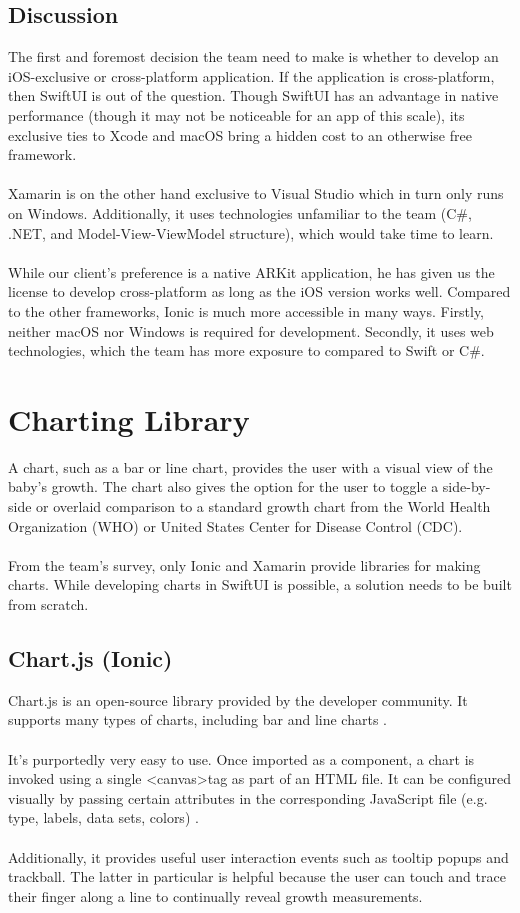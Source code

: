 \documentclass[onecolumn, draftclsnofoot,10pt, compsoc]{IEEEtran}
\begin{document}
\subsection{Discussion}
The first and foremost decision the team need to make is whether to develop an iOS-exclusive or cross-platform application. If the application is cross-platform, then SwiftUI is out of the question. Though SwiftUI has an advantage in native performance (though it may not be noticeable for an app of this scale), its exclusive ties to Xcode and macOS bring a hidden cost to an otherwise free framework.
\\\\
Xamarin is on the other hand exclusive to Visual Studio which in turn only runs on Windows. Additionally, it uses technologies unfamiliar to the team (C\#, .NET, and Model-View-ViewModel structure), which would take time to learn.
\\\\
While our client's preference is a native ARKit application, he has given us the license to develop cross-platform as long as the iOS version works well. Compared to the other frameworks, Ionic is much more accessible in many ways. Firstly, neither macOS nor Windows is required for development. Secondly, it uses web technologies, which the team has more exposure to compared to Swift or C\#.


\section{Charting Library}
A chart, such as a bar or line chart, provides the user with a visual view of the baby's growth. The chart also gives the option for the user to toggle a side-by-side or overlaid comparison to a standard growth chart from the World Health Organization (WHO) or United States Center for Disease Control (CDC).
\\\\
From the team's survey, only Ionic and Xamarin provide libraries for making charts. While developing charts in SwiftUI is possible, a solution needs to be built from scratch.

\subsection{Chart.js (Ionic)}
Chart.js is an open-source library provided by the developer community. It supports many types of charts, including bar and line charts \cite{chart.js}.
\\\\
It's purportedly very easy to use. Once imported as a component, a chart is invoked using a single \textless canvas\textgreater tag as part of an HTML file. It can be configured visually by passing certain attributes in the corresponding JavaScript file (e.g. type, labels, data sets, colors) \cite{chart.js_intro}.
\\\\
Additionally, it provides useful user interaction events such as tooltip popups and trackball. The latter in particular is helpful because the user can touch and trace their finger along a line to continually reveal growth measurements.
\end{document}
